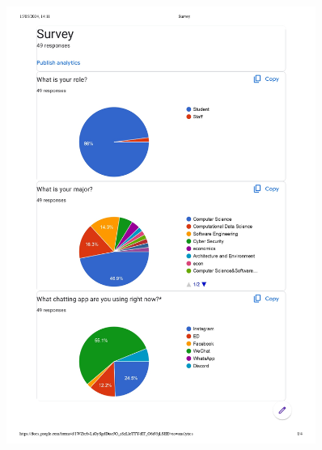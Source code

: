 \documentclass[12pt]{article}
\begin{document}
\begin{figure}[H]
    \centering
    \includegraphics[width=0.9\textwidth]{graphs/Survey-summary_page-0001.jpg}
\end{figure}
\end{document}
